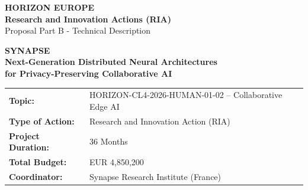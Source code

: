 \documentclass[11pt,a4paper]{article}
\begin{document}
\thispagestyle{empty}
\begin{center}
    \vspace*{10mm}
    
    {\large\bfseries HORIZON EUROPE}\\[5mm]
    {\large\bfseries Research and Innovation Actions (RIA)}\\[3mm]
    {\large Proposal Part B - Technical Description}\\[15mm]
    
    \begin{tcolorbox}[colback=primary, colframe=primary, arc=5pt, width=0.9\textwidth, center, halign=center, valign=center, colupper=white, top=15pt, bottom=15pt]
        {\Huge\bfseries SYNAPSE}\\[3mm]
        {\large\bfseries Next-Generation Distributed Neural Architectures\\ for Privacy-Preserving Collaborative AI}
    \end{tcolorbox}
    
    \vspace{15mm}
    
    \begin{tabularx}{0.9\textwidth}{l X}
        \textbf{Topic:} & HORIZON-CL4-2026-HUMAN-01-02 -- Collaborative Edge AI \\
        \textbf{Type of Action:} & Research and Innovation Action (RIA) \\
        \textbf{Project Duration:} & 36 Months \\
        \textbf{Total Budget:} & EUR 4,850,200 \\
        \textbf{Coordinator:} & Synapse Research Institute (France) \\
    \end{tabularx}
    
    \vspace{15mm}
    

\end{center}
\end{document}
